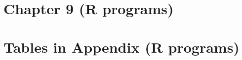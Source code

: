 \documentclass[11pt,a4paper]{article}
\begin{document}
\clearpage
\section*{Chapter 9 (R programs)}











\clearpage
\section*{Tables in Appendix (R programs)}


\end{document}
